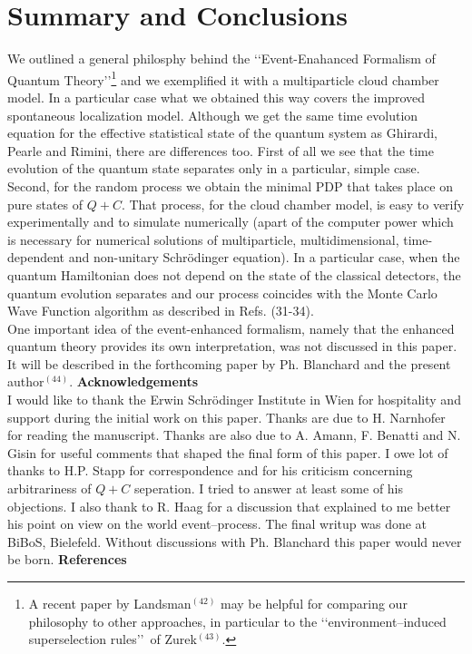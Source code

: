 \documentclass[12pt]{article}
\def\lqq{\lq\lq}
\def\rqq{\rq\rq}
\begin{document}
\section{Summary and Conclusions}
We outlined a general philosphy behind the \lqq Event-Enahanced Formalism
of Quantum Theory\rqq \footnote{A recent paper by
Landsman$^{(42)}$ may be helpful for comparing our philosophy
to other approaches, in particular to
the \lqq environment--induced superselection rules\rqq\,  of
Zurek$^{(43)}$.} and we exemplified it with a multiparticle cloud
chamber model. In a particular case what we obtained this way covers
the improved spontaneous localization model. Although we get the same
time evolution equation for the effective statistical state of the quantum
system as Ghirardi, Pearle and Rimini, there are differences too. First of
all we see that the time evolution of the quantum state separates
only in a particular, simple case. Second, for the random process we obtain
the minimal PDP that takes place on pure states of $Q+C$. That process, for
the cloud chamber model, is easy to verify experimentally and to simulate
numerically (apart of the computer power which is necessary for  numerical
solutions of multiparticle,
multidimensional, time-dependent and non-unitary Schr\"odinger equation).
In a particular case, when the quantum Hamiltonian does not depend on
the state of the classical detectors, the quantum evolution separates
and our process coincides with the Monte Carlo Wave Function algorithm
as described in Refs. (31-34).\\
One important  idea of the event-enhanced formalism, namely that the enhanced
quantum theory provides its own interpretation, was not discussed in this
paper.  It will be described in the forthcoming paper by Ph. Blanchard and
the present author$^{(44)}$.
\vskip10pt
\noindent
{\bf Acknowledgements}\\
I would like to thank the Erwin Schr\"odinger Institute in Wien
for hospitality and support during the initial work on this paper.
Thanks are
due to H. Narnhofer for reading the manuscript. Thanks are also due to
A. Amann, F. Benatti and N. Gisin for
useful comments that shaped the final form of this paper.
I owe lot of thanks to  H.P. Stapp for correspondence
and for his criticism concerning arbitrariness of $Q+C$ seperation. I tried
to answer at least some of his objections.
I also thank to R. Haag for a discussion that explained to me
better his point on view on the world event--process.
The final writup was done at BiBoS, Bielefeld. Without
discussions with Ph. Blanchard this paper would never be born.
\vskip10pt
\noindent
{\large{\bf References}}
\end{document}
